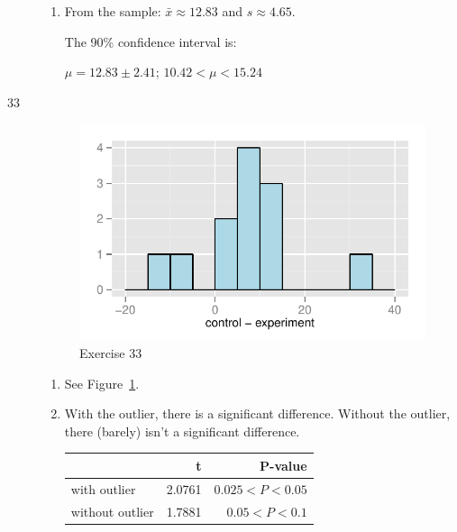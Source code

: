 \documentclass[letterpaper, landscape]{exam}
\begin{document}
\begin{description}
\begin{enumerate}[label = (\alph*)]
          \item From the sample: $\bar{x} \approx 12.83$ and $s \approx 4.65$.

            The 90\% confidence interval is: 
            
            $\mu = 12.83 \pm 2.41$; $10.42 < \mu < 15.24$

        \end{enumerate}

      \item[33]
        \begin{figure}[H]
          \centering
          \includegraphics[scale = 1.0]{figures/ex33.pdf}
          \caption{Exercise 33}\label{fig:ex33}
        \end{figure}

        \begin{enumerate}[label = (\alph*)]
          \item See Figure~\ref{fig:ex33}.

          \item 
            With the outlier, there is a significant difference. Without the
            outlier, there (barely) isn't a significant difference.

            \begin{tabular}[H]{lrr}
              \toprule
                              & t      & P-value \\
              \midrule
              with outlier    & 2.0761 & $0.025 < P < 0.05$ \\
              without outlier & 1.7881 & $0.05 < P < 0.1$ \\
              \bottomrule
            \end{tabular}


\end{enumerate}
\end{description}
\end{document}
